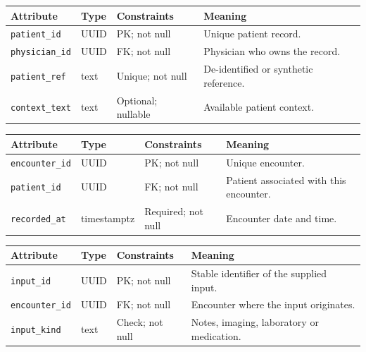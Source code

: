 \begin{reporttable}
\setlength{\tabcolsep}{5pt}
\centering
\small
\caption{Patient attributes, types and constraints.}
\label{tab:kashaf:dict-patient}
\begin{tabular}{|p{}|p{}|p{}|p{}|}
\hline
Attribute & Type & Constraints & Meaning \\ \hline
\texttt{patient\_id} & UUID & PK; not null & Unique patient record. \\ \hline
\texttt{physician\_id} & UUID & FK; not null & Physician who owns the record. \\ \hline
\texttt{patient\_ref} & text & Unique; not null & De-identified or synthetic reference. \\ \hline
\texttt{context\_text} & text & Optional; nullable & Available patient context. \\ \hline
\end{tabular}
\end{reporttable}

\begin{reporttable}
\setlength{\tabcolsep}{5pt}
\centering
\small
\caption{Encounter attributes, types and constraints.}
\label{tab:kashaf:dict-encounter}
\begin{tabular}{|p{}|p{}|p{}|p{}|}
\hline
Attribute & Type & Constraints & Meaning \\ \hline
\texttt{encounter\_id} & UUID & PK; not null & Unique encounter. \\ \hline
\texttt{patient\_id} & UUID & FK; not null & Patient associated with this encounter. \\ \hline
\texttt{recorded\_at} & timestamptz & Required; not null & Encounter date and time. \\ \hline
\end{tabular}
\end{reporttable}

\begin{reporttable}
\setlength{\tabcolsep}{5pt}
\centering
\small
\caption{ClinicalInput attributes, types and constraints.}
\label{tab:kashaf:dict-clinicalinput}
\begin{tabular}{|p{}|p{}|p{}|p{}|}
\hline
Attribute & Type & Constraints & Meaning \\ \hline
\texttt{input\_id} & UUID & PK; not null & Stable identifier of the supplied input. \\ \hline
\texttt{encounter\_id} & UUID & FK; not null & Encounter where the input originates. \\ \hline
\texttt{input\_kind} & text & Check; not null & Notes, imaging, laboratory or medication. \\ \hline
\end{tabular}
\end{reporttable}


